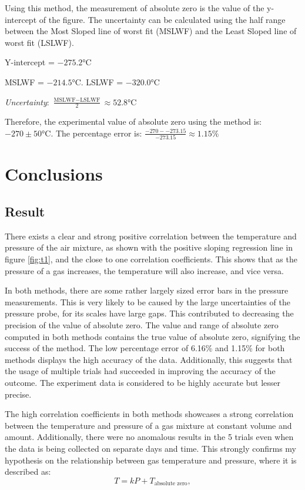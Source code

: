 \documentclass[a4paper,12pt]{article}
\begin{document}
Using this method, the measurement of absolute zero is the value of the y-intercept of the figure. The uncertainty can be calculated using the half range between the Most Sloped line of worst fit (MSLWF) and the Least Sloped line of worst fit (LSLWF).

Y-intercept = $-275.2\si{\celsius}$

MSLWF = $-214.5\si{\celsius}$. LSLWF = $-320.0\si{\celsius}$

\textit{Uncertainty}: $\frac{\text{MSLWF} - \text{LSLWF}}{2} \approx 52.8 \si{\celsius}$

Therefore, the experimental value of absolute zero using the method is: $-270 \pm 50 \si{\celsius}$. The percentage error is: $\frac{-270 - -273.15}{-273.15} \approx 1.15\%$

\section{Conclusions}
\subsection{Result}
There exists a clear and strong positive correlation between the temperature and pressure of the air mixture, as shown with the positive sloping regression line in figure \ref{fig:t1}, and the close to one correlation coefficients. This shows that as the pressure of a gas increases, the temperature will also increase, and vice versa.

In both methods, there are some rather largely sized error bars in the pressure measurements. This is very likely to be caused by the large uncertainties of the pressure probe, for its scales have large gaps. This contributed to decreasing the precision of the value of absolute zero.
The value and range of absolute zero computed in both methods contains the true value of absolute zero, signifying the success of the method. The low percentage error of 6.16\% and 1.15\% for both methods displays the high accuracy of the data. Additionally, this suggests that the usage of multiple trials had succeeded in improving the accuracy of the outcome. The experiment data is considered to be highly accurate but lesser precise.

The high correlation coefficients in both methods showcases a strong correlation between the temperature and pressure of a gas mixture at constant volume and amount. Additionally, there were no anomalous results in the 5 trials even when the data is being collected on separate days and time. This strongly confirms my hypothesis on the relationship between gas temperature and pressure, where it is described as:
\[
    T = kP + T_{\text{absolute zero}},
\]
\end{document}
